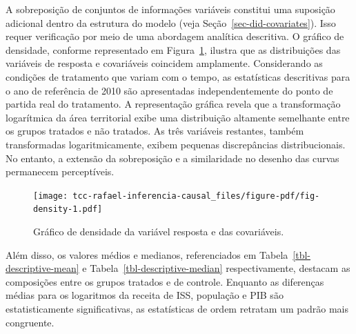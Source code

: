 \documentclass[12pt, a4paper, twoside]{article}
\numberwithin{equation}{subsection} %
\begin{document}
A sobreposição de conjuntos de informações variáveis
\hspace{0pt}\hspace{0pt}constitui uma suposição adicional dentro da
estrutura do modelo (veja Seção~\ref{sec-did-covariates}). Isso requer
verificação por meio de uma abordagem analítica descritiva. O gráfico de
densidade, conforme representado em Figura~\ref{fig-density}, ilustra
que as distribuições das variáveis \hspace{0pt}\hspace{0pt}de resposta e
covariáveis \hspace{0pt}\hspace{0pt}coincidem amplamente. Considerando
as condições de tratamento que variam com o tempo, as estatísticas
descritivas para o ano de referência de 2010 são apresentadas
independentemente do ponto de partida real do tratamento. A
representação gráfica revela que a transformação logarítmica da área
territorial exibe uma distribuição altamente semelhante entre os grupos
tratados e não tratados. As três variáveis
\hspace{0pt}\hspace{0pt}restantes, também transformadas
logaritmicamente, exibem pequenas discrepâncias distribucionais. No
entanto, a extensão da sobreposição e a similaridade no desenho das
curvas permanecem perceptíveis.

\begin{figure}[H]

{\centering \texttt{[image: tcc-rafael-inferencia-causal\_files/figure-pdf/fig-density-1.pdf]}

}

\caption{\label{fig-density}Gráfico de densidade da variável resposta e
das covariáveis.}

\end{figure}

Além disso, os valores médios e medianos, referenciados em
Tabela~\ref{tbl-descriptive-mean} e Tabela~\ref{tbl-descriptive-median}
respectivamente, destacam as composições entre os grupos tratados e de
controle. Enquanto as diferenças médias para os logaritmos da receita de
ISS, população e PIB são estatisticamente significativas, as
estatísticas de ordem retratam um padrão mais congruente.
\end{document}
